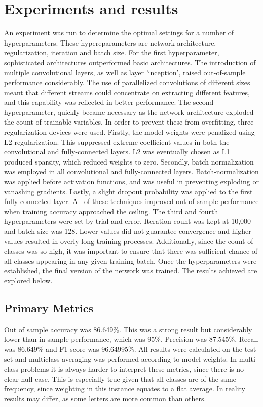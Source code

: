 \documentclass[fleqn,10pt]{SelfArx} %
\begin{document}
\section{Experiments and results}
An experiment was run to determine the optimal settings for a number of hyperparameters. These hypereparameters are network architecture, regularization, iteration and batch size.
\newline
For the first hyperparameter, sophisticated architectures outperformed basic architectures. The introduction of multiple convolutional layers, as well as layer 'inception', raised out-of-sample performance considerably. The use of parallelized convolutions of different sizes meant that different streams could concentrate on extracting different features, and this capability was reflected in better performance.
\newline
The second hyperparameter, quickly became necessary as the network architecture exploded the count of trainable variables. In order to prevent these from overfitting, three regularization devices were used. Firstly, the model weights were penalized using L2 regularization. This suppressed extreme coefficient values in both the convolutional and fully-connected layers. L2 was eventually chosen as L1 produced sparsity, which reduced weights to zero. Secondly, batch normalization was employed in all convolutional and fully-connected layers. Batch-normalization was applied before activation functions, and was useful in preventing exploding or vanashing gradients. Lastly, a slight dropout probability was applied to the first fully-connected layer. All of these techniques improved out-of-sample performance when training accuracy approached the ceiling.
\newline
The third and fourth hyperparameters were set by trial and error. Iteration count was kept at 10,000 and batch size was 128. Lower values did not guarantee convergence and higher values resulted in overly-long training processes. Additionally, since the count of classes was so high, it was important to ensure that there was sufficient chance of all classes appearing in any given training batch.
\newline
Once the hyperparameters were established, the final version of the network was trained. The results achieved are explored below.

\subsection{Primary Metrics}
Out of sample accuracy was 86.649\%. This was a strong result but considerably lower than in-sample performance, which was 95\%. Precision was 87.545\%, Recall was 86.649\% and F1 score was 96.64995\%. All results were calculated on the test set and multiclass averaging was performed according to model weights. In multi-class problems it is always harder to interpret these metrics, since there is no clear null case. This is especially true given that all classes are of the same frequency, since weighting in this instance equates to a flat average. In reality results may differ, as some letters are more common than others.
\end{document}
